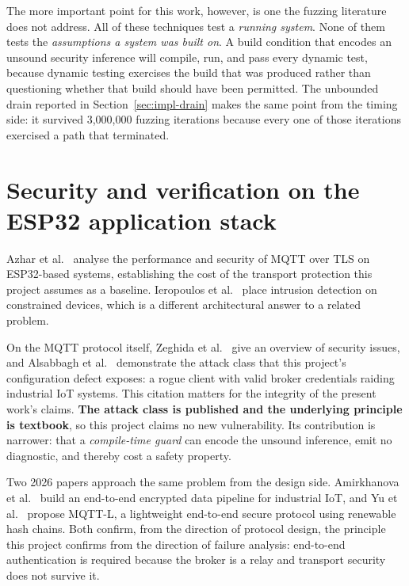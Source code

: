 The more important point for this work, however, is one the fuzzing literature does not
address. All of these techniques test a \emph{running system}. None of them tests the
\emph{assumptions a system was built on}. A build condition that encodes an unsound security
inference will compile, run, and pass every dynamic test, because dynamic testing exercises the
build that was produced rather than questioning whether that build should have been permitted.
The unbounded drain reported in Section~\ref{sec:impl-drain} makes the same point from the
timing side: it survived 3,000,000 fuzzing iterations because every one of those iterations
exercised a path that terminated.

\section{Security and verification on the ESP32 application stack}

Azhar et al.\ \cite{mqtttls2026} analyse the performance and security of MQTT over TLS on
ESP32-based systems, establishing the cost of the transport protection this project assumes as
a baseline. Ieropoulos et al.\ \cite{ondevice2026} place intrusion detection on constrained
devices, which is a different architectural answer to a related problem.

On the MQTT protocol itself, Zeghida et al.\ \cite{zeghida2024} give an overview of security
issues, and Alsabbagh et al.\ \cite{pirates2024} demonstrate the attack class that this
project's configuration defect exposes: a rogue client with valid broker credentials raiding
industrial IoT systems. This citation matters for the integrity of the present work's claims.
\textbf{The attack class is published and the underlying principle is textbook}, so this project
claims no new vulnerability. Its contribution is narrower: that a \emph{compile-time guard} can
encode the unsound inference, emit no diagnostic, and thereby cost a safety property.

Two 2026 papers approach the same problem from the design side. Amirkhanova et al.\
\cite{amirkhanova2026} build an end-to-end encrypted data pipeline for industrial IoT, and Yu
et al.\ \cite{mqttl2026} propose MQTT-L, a lightweight end-to-end secure protocol using
renewable hash chains. Both confirm, from the direction of protocol design, the principle this
project confirms from the direction of failure analysis: end-to-end authentication is required
because the broker is a relay and transport security does not survive it.

